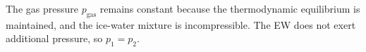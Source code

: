 The gas pressure \( p_{\text{gas}} \) remains constant because the thermodynamic equilibrium is maintained, and the ice-water mixture is incompressible. The EW does not exert additional pressure, so \( p_1 = p_2 \).